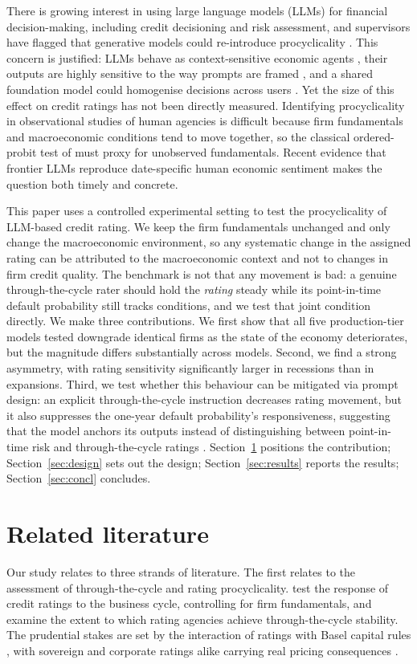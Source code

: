 \documentclass[a4paper,fleqn]{cas-sc}
\begin{document}
There is growing interest in using large language models (LLMs) for financial decision-making,
including credit decisioning and risk assessment, and supervisors have flagged that generative models
could re-introduce procyclicality \citep{bis2024}. This concern is justified: LLMs behave as
context-sensitive economic agents \citep{horton2023,binz2023}, their outputs are highly sensitive to
the way prompts are framed \citep{tversky1981}, and a shared foundation model could homogenise
decisions across users \citep{bommasani2022}. Yet the size of this effect on credit ratings has not
been directly measured. Identifying procyclicality in observational studies of human agencies is
difficult because firm fundamentals and macroeconomic conditions tend to move together, so the
classical ordered-probit test of \citet{amato2004} must proxy for unobserved fundamentals. Recent
evidence that frontier LLMs reproduce date-specific human economic sentiment \citep{graham2026} makes
the question both timely and concrete.

This paper uses a controlled experimental setting to test the procyclicality of LLM-based credit
rating. We keep the firm fundamentals unchanged and only change the macroeconomic environment, so any
systematic change in the assigned rating can be attributed to the macroeconomic context and not to
changes in firm credit quality. The benchmark is not that any movement is bad: a genuine
through-the-cycle rater should hold the \emph{rating} steady while its point-in-time default
probability still tracks conditions, and we test that joint condition directly. We make three
contributions. We first show that all five production-tier models tested downgrade identical firms as
the state of the economy deteriorates, but the magnitude differs substantially across models. Second,
we find a strong asymmetry, with rating sensitivity significantly larger in recessions than in
expansions. Third, we test whether this behaviour can be mitigated via prompt design: an explicit
through-the-cycle instruction decreases rating movement, but it also suppresses the one-year default
probability's responsiveness, suggesting that the model anchors its outputs instead of distinguishing
between point-in-time risk and through-the-cycle ratings \citep{tversky1974}. Section~\ref{sec:lit}
positions the contribution; Section~\ref{sec:design} sets out the design; Section~\ref{sec:results}
reports the results; Section~\ref{sec:concl} concludes.

\section{Related literature}\label{sec:lit}
Our study relates to three strands of literature. The first relates to the assessment of
through-the-cycle and rating procyclicality. \citet{amato2004} test the response of credit ratings to
the business cycle, controlling for firm fundamentals, and \citet{loffler2004,loffler2013} examine the
extent to which rating agencies achieve through-the-cycle stability. The prudential stakes are set by
the interaction of ratings with Basel capital rules \citep{kashyap2004,gordy2006}, with sovereign and
corporate ratings alike carrying real pricing consequences \citep{cantor1996}.
\end{document}
